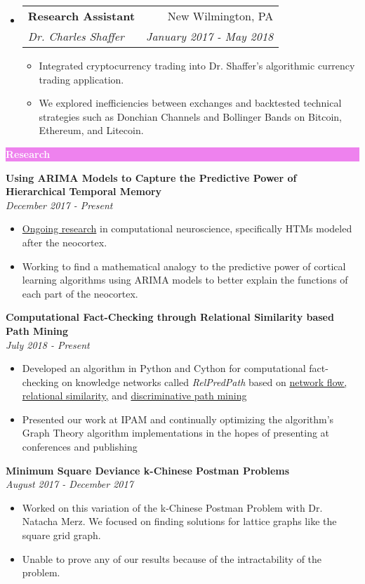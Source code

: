 \documentclass[letterpaper,11pt]{article}
\makeatletter
\newcommand{\resitem}[1]{\item #1 \vspace{-2pt}}
\newcommand{\resheading}[1]{{\large \colorbox{violet}{\begin{minipage}{\textwidth}{\textbf{#1 \vphantom{p\^{E}}}}\end{minipage}}}}
\newcommand{\ressubheading}[4]{
	\begin{tabular*}{7.0in}{l@{\extracolsep{\fill}}r}
		\textbf{#1} & #2 \\
		\textit{#3} & \textit{#4} \\
	\end{tabular*}\vspace{-6pt}}
\makeatother
\begin{document}
\begin{itemize}[topsep=3pt, itemsep=1pt]
		\item
		\ressubheading{Research Assistant}{New Wilmington, PA}{Dr. Charles Shaffer}{January 2017 - May 2018}
		\begin{itemize}[topsep=3pt, itemsep=1pt]
			\resitem{Integrated cryptocurrency trading into Dr. Shaffer's algorithmic currency trading application.}
			\resitem{We explored inefficiencies between exchanges and backtested technical strategies such as Donchian Channels and Bollinger Bands on Bitcoin, Ethereum, and Litecoin.}
		\end{itemize}
		
	\end{itemize}
	
	\resheading{\textcolor{white}{Research}}
	
		\vspace{0.1in}
		
		\textbf{Using ARIMA Models to Capture the Predictive Power of Hierarchical Temporal Memory} \\ \textit{December 2017 - Present}
		\begin{itemize}[topsep=3pt, itemsep=1pt]
			\resitem{\href{https://github.com/alexandermichels/HonorsResearch}{Ongoing research} in computational neuroscience, specifically HTMs modeled after the neocortex.}
			\resitem{Working to find a mathematical analogy to the predictive power of cortical learning algorithms using ARIMA models to better explain the functions of each part of the neocortex.}
		\end{itemize}
	\pagebreak
		
		\textbf{Computational Fact-Checking through Relational Similarity based Path Mining} \\	\textit{July 2018 - Present}
		\begin{itemize}[topsep=3pt, itemsep=1pt]
			\resitem{Developed an algorithm in Python and Cython for computational fact-checking on knowledge networks called \textit{RelPredPath} based on \href{https://arxiv.org/pdf/1708.07239.pdf}{network flow, relational similarity,} and \href{https://arxiv.org/pdf/1510.05911.pdf}{discriminative path mining} }
			\resitem{Presented our work at IPAM and continually optimizing the algorithm's Graph Theory algorithm implementations in the hopes of presenting at conferences and publishing}
		\end{itemize}
		
		\textbf{Minimum Square Deviance k-Chinese Postman Problems} \\ \textit{August 2017 - December 2017}
		\begin{itemize}[topsep=3pt, itemsep=1pt]
			\resitem{Worked on this variation of the k-Chinese Postman Problem with Dr. Natacha Merz. We focused on finding solutions for lattice graphs like the square grid graph.}
			\resitem{Unable to prove any of our results because of the intractability of the problem.}
		\end{itemize}
\end{document}
